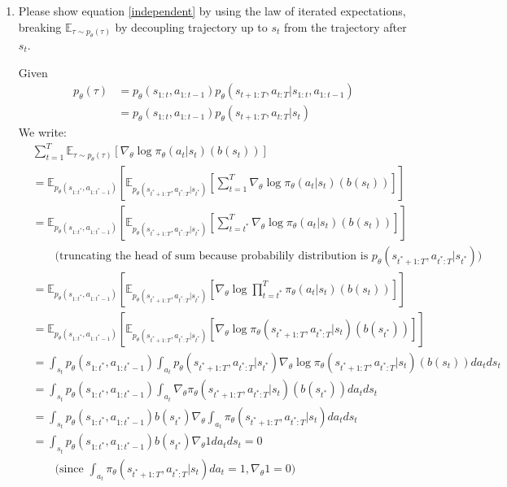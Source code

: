\documentclass[12pt]{article}
\begin{document}
\begin{enumerate} [label=(\alph*)]
\begin{enumerate}
Since the Markov chain is memoryless, the current state/action only depends on its most recent action/state.  
\item Please show equation \ref{independent} by using the law of iterated expectations, breaking $\mathbb{E}_{\tau \sim p_\theta(\tau)}$ by decoupling trajectory up to $s_t$ from the trajectory after $s_t$.

Given
%
\begin{align*}
p_\theta(\tau) &= p_\theta(s_{1:t}, a_{1:t-1}) p_\theta(s_{t+1:T}, a_{t:T} | s_{1:t}, a_{1:t-1}) \\
&= p_\theta(s_{1:t}, a_{1:t-1}) p_\theta(s_{t+1:T}, a_{t:T} | s_t)
\end{align*}
%
We write:
%
\begin{align*}
&\sum_{t=1}^T \mathbb{E}_{\tau \sim p_\theta(\tau)}\left[ \nabla_\theta \log \pi_\theta(a_t|s_t) \left(b(s_t)\right)\right] \\
&= \mathbb{E}_{p_\theta(s_{1:t^*}, a_{1:t^*-1})} \left[ \mathbb{E}_{p_\theta(s_{t^*+1:T}, a_{t^*:T} | s_{t^*})} \left[ \sum_{t=1}^T \nabla_\theta \log \pi_\theta(a_t|s_t) \left(b(s_t)\right) \right]  \right] \\
&= \mathbb{E}_{p_\theta(s_{1:t^*}, a_{1:t^*-1})} \left[ \mathbb{E}_{p_\theta(s_{t^*+1:T}, a_{t^*:T} | s_{t^*})} \left[ \sum_{t=t^*}^T \nabla_\theta \log \pi_\theta(a_t|s_t) \left(b(s_t)\right) \right]  \right] \\
&\qquad \text{(truncating the head of sum because probabilily distribution is $p_\theta(s_{t^*+1:T}, a_{t^*:T} | s_{t^*})$)} \\
&= \mathbb{E}_{p_\theta(s_{1:t^*}, a_{1:t^*-1})} \left[ \mathbb{E}_{p_\theta(s_{t^*+1:T}, a_{t^*:T} | s_{t^*})} \left[ \nabla_\theta \log \prod_{t=t^*}^T \pi_\theta(a_t|s_t) \left(b(s_t)\right) \right]  \right] \\
&= \mathbb{E}_{p_\theta(s_{1:t^*}, a_{1:t^*-1})} \left[ \mathbb{E}_{p_\theta(s_{t^*+1:T}, a_{t^*:T} | s_{t^*})} \left[ \nabla_\theta \log \pi_\theta(s_{t^*+1:T}, a_{t^*:T} |s_t) \left(b(s_{t^*})\right) \right]  \right] \\
&= \int_{s_t} p_\theta(s_{1:t^*}, a_{1:t^*-1}) \int_{a_t} p_\theta(s_{t^*+1:T}, a_{t^*:T} | s_{t^*}) \nabla_\theta \log \pi_\theta(s_{t^*+1:T}, a_{t^*:T} |s_t) \left(b(s_t)\right) da_t ds_t \\
&= \int_{s_t} p_\theta(s_{1:t^*}, a_{1:t^*-1}) \int_{a_t} \nabla_\theta \pi_\theta(s_{t^*+1:T}, a_{t^*:T} |s_t)  \left(b(s_{t^*})\right) da_t ds_t \\
&= \int_{s_t} p_\theta(s_{1:t^*}, a_{1:t^*-1}) b(s_{t^*}) \nabla_\theta \int_{a_t} \pi_\theta(s_{t^*+1:T}, a_{t^*:T} |s_t) da_t ds_t \\
&= \int_{s_t} p_\theta(s_{1:t^*}, a_{1:t^*-1}) b(s_{t^*}) \nabla_\theta 1 da_t ds_t = 0\\
&\qquad \text{(since $\int_{a_t} \pi_\theta(s_{t^*+1:T}, a_{t^*:T} |s_t) da_t = 1, \nabla_\theta 1 = 0$)} \\
\end{align*}
%
\end{enumerate}
\end{enumerate}
\end{document}
